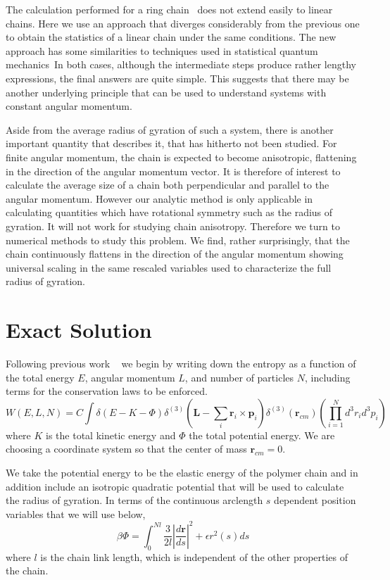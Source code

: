 \documentclass[pre,showpacs]{revtex4}
\begin{document}
The calculation performed for a ring chain~\cite{DeutschExactVac} does not
extend easily to linear chains.  Here we use an approach that diverges considerably
from the previous one to obtain the statistics of a linear chain under
the same conditions. The new approach has some similarities to techniques used in statistical quantum mechanics~\cite{KleinertBook}In both cases, although the intermediate steps
produce rather lengthy expressions, the final answers are quite simple.
This suggests that there may be another underlying principle that can be
used to understand systems with constant angular momentum.

Aside from the average radius of gyration of such a system, there is
another important quantity that describes it, that has hitherto not
been studied. For finite angular momentum, the chain is expected to
become anisotropic, flattening in the direction of the angular momentum
vector. It is therefore of interest to calculate the average size
of a chain both perpendicular and parallel to the angular momentum.
However our analytic method is only applicable in calculating quantities
which have rotational symmetry such as the radius of gyration. It will
not work for studying chain anisotropy. Therefore we turn to numerical
methods to study this problem. We find, rather surprisingly, that the
chain continuously flattens in the direction of the angular momentum
showing universal scaling in the same rescaled variables used to
characterize the full radius of gyration. 



\section{Exact Solution}
Following previous work ~\cite{laliena} we begin by writing down the entropy as a function of the total energy $E$, angular momentum $L$, and number of particles $N$,  including terms for the conservation laws to be enforced. 
\begin{equation}
W(E,L,N) = C \int \delta(E - K - \Phi)\delta^{(3)}(\mathbf{L} - \sum_i \mathbf{r}_i \times \mathbf{p}_i)\delta^{(3)}(\mathbf{r}_{cm})(\prod_{i=1}^N d^3r_id^3p_i)
\end{equation}
where $K$ is the total kinetic energy and $\Phi$ the total potential energy. We are choosing a coordinate system so that
the center of mass $\mathbf{r}_{cm} = 0$.

We take the potential energy to be the elastic energy of the polymer chain and in addition include an isotropic quadratic potential that
will be used to calculate the radius of gyration. In terms of the continuous arclength $s$ dependent position variables that we will use 
below, 
\begin{equation}\label{eq:DefPhi}
\beta \Phi =  \int^{Nl}_0 \frac{3}{2l} |\frac{d \mathbf{r}}{ds}|^2 + \epsilon r^2(s)  ds 
\end{equation}
where $l$ is the chain link length, which is independent of the other properties of the chain.
\end{document}
